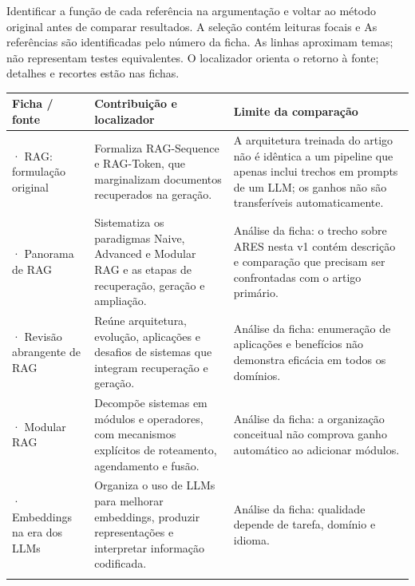 Identificar a função de cada referência na argumentação e voltar ao método original antes de comparar resultados. A seleção contém leituras focais e
\clearpage
{}
As referências são identificadas pelo número da ficha. As linhas aproximam temas; não representam testes equivalentes. O localizador orienta o retorno à fonte; detalhes e recortes estão nas fichas.

{\small\renewcommand{\arraystretch}{1.3}
\begin{tabularx}{\textwidth}{@{}>{\raggedright\arraybackslash}p{29mm}>{\raggedright\arraybackslash}X>{\raggedright\arraybackslash}X@{}}
\toprule
\textbf{Ficha / fonte} & \textbf{Contribuição e localizador} & \textbf{Limite da comparação}\\
\midrule
09 · RAG: formulação original & Formaliza RAG-Sequence e RAG-Token, que marginalizam documentos recuperados na geração.\par\smallskip{\footnotesize Resumo, p. 1 do PDF} & A arquitetura treinada do artigo não é idêntica a um pipeline que apenas inclui trechos em prompts de um LLM; os ganhos não são transferíveis automaticamente.\\
\addlinespace[5pt]
26 · Panorama de RAG & Sistematiza os paradigmas Naive, Advanced e Modular RAG e as etapas de recuperação, geração e ampliação.\par\smallskip{\footnotesize Resumo} & Análise da ficha: o trecho sobre ARES nesta v1 contém descrição e comparação que precisam ser confrontadas com o artigo primário.\\
\addlinespace[5pt]
27 · Revisão abrangente de RAG & Reúne arquitetura, evolução, aplicações e desafios de sistemas que integram recuperação e geração.\par\smallskip{\footnotesize Resumo} & Análise da ficha: enumeração de aplicações e benefícios não demonstra eficácia em todos os domínios.\\
\addlinespace[5pt]
28 · Modular RAG & Decompõe sistemas em módulos e operadores, com mecanismos explícitos de roteamento, agendamento e fusão.\par\smallskip{\footnotesize Resumo} & Análise da ficha: a organização conceitual não comprova ganho automático ao adicionar módulos.\\
\addlinespace[5pt]
29 · Embeddings na era dos LLMs & Organiza o uso de LLMs para melhorar embeddings, produzir representações e interpretar informação codificada.\par\smallskip{\footnotesize Taxonomia} & Análise da ficha: qualidade depende de tarefa, domínio e idioma.\\
\addlinespace[5pt]
\bottomrule
\end{tabularx}}

